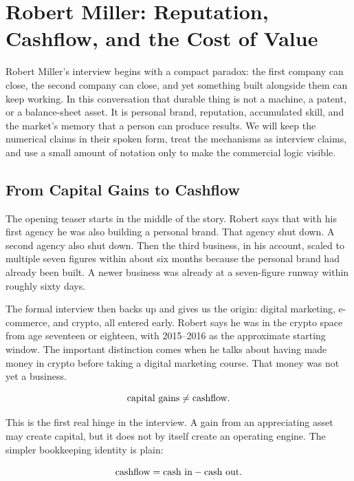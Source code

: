 \chapter{Robert Miller: Reputation, Cashflow, and the Cost of Value}

Robert Miller's interview begins with a compact paradox: the first company can close, the second company can close, and yet something built alongside them can keep working. In this conversation that durable thing is not a machine, a patent, or a balance-sheet asset. It is personal brand, reputation, accumulated skill, and the market's memory that a person can produce results. We will keep the numerical claims in their spoken form, treat the mechanisms as interview claims, and use a small amount of notation only to make the commercial logic visible.

\section{From Capital Gains to Cashflow}

The opening teaser starts in the middle of the story. Robert says that with his first agency he was also building a personal brand. That agency shut down. A second agency also shut down. Then the third business, in his account, scaled to multiple seven figures within about six months because the personal brand had already been built. A newer business was already at a seven-figure runway within roughly sixty days.

The formal interview then backs up and gives us the origin: digital marketing, e-commerce, and crypto, all entered early. Robert says he was in the crypto space from age seventeen or eighteen, with 2015--2016 as the approximate starting window. The important distinction comes when he talks about having made money in crypto before taking a digital marketing course. That money was not yet a business.

\begin{equation}
\hbox{capital gains} \neq \hbox{cashflow}.
\end{equation}

This is the first real hinge in the interview. A gain from an appreciating asset may create capital, but it does not by itself create an operating engine. The simpler bookkeeping identity is plain:

\begin{equation}
\hbox{cashflow} = \hbox{cash in} - \hbox{cash out}.
\end{equation}

